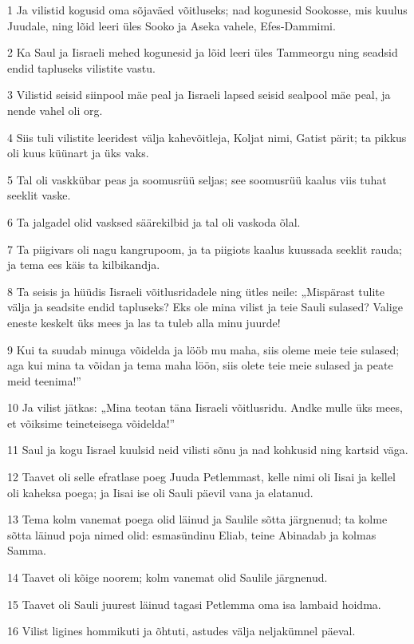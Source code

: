 \par 1 Ja vilistid kogusid oma sõjaväed võitluseks; nad kogunesid Sookosse, mis kuulus Juudale, ning lõid leeri üles Sooko ja Aseka vahele, Efes-Dammimi.
\par 2 Ka Saul ja Iisraeli mehed kogunesid ja lõid leeri üles Tammeorgu ning seadsid endid tapluseks vilistite vastu.
\par 3 Vilistid seisid siinpool mäe peal ja Iisraeli lapsed seisid sealpool mäe peal, ja nende vahel oli org.
\par 4 Siis tuli vilistite leeridest välja kahevõitleja, Koljat nimi, Gatist pärit; ta pikkus oli kuus küünart ja üks vaks.
\par 5 Tal oli vaskkübar peas ja soomusrüü seljas; see soomusrüü kaalus viis tuhat seeklit vaske.
\par 6 Ta jalgadel olid vasksed säärekilbid ja tal oli vaskoda õlal.
\par 7 Ta piigivars oli nagu kangrupoom, ja ta piigiots kaalus kuussada seeklit rauda; ja tema ees käis ta kilbikandja.
\par 8 Ta seisis ja hüüdis Iisraeli võitlusridadele ning ütles neile: „Mispärast tulite välja ja seadsite endid tapluseks? Eks ole mina vilist ja teie Sauli sulased? Valige eneste keskelt üks mees ja las ta tuleb alla minu juurde!
\par 9 Kui ta suudab minuga võidelda ja lööb mu maha, siis oleme meie teie sulased; aga kui mina ta võidan ja tema maha löön, siis olete teie meie sulased ja peate meid teenima!”
\par 10 Ja vilist jätkas: „Mina teotan täna Iisraeli võitlusridu. Andke mulle üks mees, et võiksime teineteisega võidelda!”
\par 11 Saul ja kogu Iisrael kuulsid neid vilisti sõnu ja nad kohkusid ning kartsid väga.
\par 12 Taavet oli selle efratlase poeg Juuda Petlemmast, kelle nimi oli Iisai ja kellel oli kaheksa poega; ja Iisai ise oli Sauli päevil vana ja elatanud.
\par 13 Tema kolm vanemat poega olid läinud ja Saulile sõtta järgnenud; ta kolme sõtta läinud poja nimed olid: esmasündinu Eliab, teine Abinadab ja kolmas Samma.
\par 14 Taavet oli kõige noorem; kolm vanemat olid Saulile järgnenud.
\par 15 Taavet oli Sauli juurest läinud tagasi Petlemma oma isa lambaid hoidma.
\par 16 Vilist ligines hommikuti ja õhtuti, astudes välja neljakümnel päeval.

